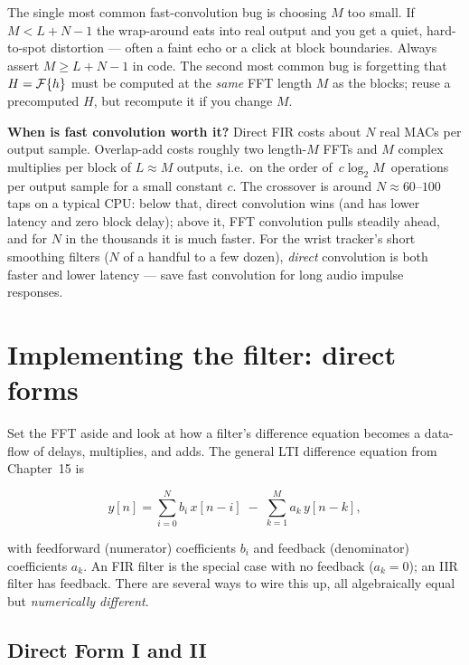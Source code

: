 \begin{trapbox}
The single most common fast-convolution bug is choosing $M$ too small. If
$M < L + N - 1$ the wrap-around eats into real output and you get a quiet,
hard-to-spot distortion --- often a faint echo or a click at block boundaries.
Always assert $M \ge L + N - 1$ in code. The second most common bug is
forgetting that $H = \mathcal{F}\{h\}$ must be computed at the \emph{same} FFT length
$M$ as the blocks; reuse a precomputed $H$, but recompute it if you change $M$.
\end{trapbox}

\begin{whybox}
\textbf{When is fast convolution worth it?} Direct FIR costs about $N$
real MACs per output sample. Overlap-add costs roughly two length-$M$ FFTs and
$M$ complex multiplies per block of $L \approx M$ outputs, i.e.\ on the order of
$\,c\log_2 M\,$ operations per output sample for a small constant $c$. The
crossover is around $N \approx 60$--$100$ taps on a typical CPU: below that,
direct convolution wins (and has lower latency and zero block delay); above it,
FFT convolution pulls steadily ahead, and for $N$ in the thousands it is
much faster. For the wrist tracker's short smoothing filters ($N$ of a
handful to a few dozen), \emph{direct} convolution is both faster and lower
latency --- save fast convolution for long audio impulse responses.
\end{whybox}

\section{Implementing the filter: direct forms}
\label{ch17:directforms}

Set the FFT aside and look at how a filter's difference equation becomes
a data-flow of delays, multiplies, and adds. The general LTI difference equation
from Chapter~15 is

\begin{equation}
  y[n] = \sum_{i=0}^{N} b_i\, x[n-i] \;-\; \sum_{k=1}^{M} a_k\, y[n-k],
  \label{ch17:diffeq}
\end{equation}

with feedforward (numerator) coefficients $b_i$ and feedback (denominator)
coefficients $a_k$. An FIR filter is the special case with no feedback
($a_k = 0$); an IIR filter has feedback. There are several ways to wire this up,
all algebraically equal but \emph{numerically different}.

\subsection{Direct Form I and II}

